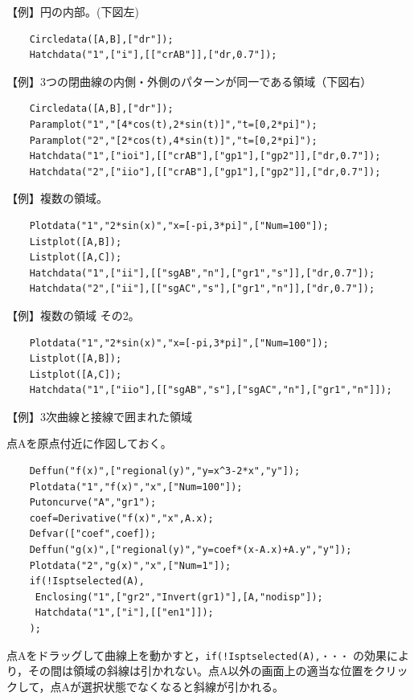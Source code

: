 \documentclass[papersize,a4paper,12pt,uplatex]{jsarticle}
\begin{document}
\begin{description}
\vspace{\baselineskip}
【例】円の内部。(下図左)
\begin{verbatim}
    Circledata([A,B],["dr"]);
    Hatchdata("1",["i"],[["crAB"]],["dr,0.7"]);
\end{verbatim}

【例】3つの閉曲線の内側・外側のパターンが同一である領域（下図右）
\begin{verbatim}
    Circledata([A,B],["dr"]);
    Paramplot("1","[4*cos(t),2*sin(t)]","t=[0,2*pi]");
    Paramplot("2","[2*cos(t),4*sin(t)]","t=[0,2*pi]");
    Hatchdata("1",["ioi"],[["crAB"],["gp1"],["gp2"]],["dr,0.7"]);
    Hatchdata("2",["iio"],[["crAB"],["gp1"],["gp2"]],["dr,0.7"]);
\end{verbatim}
\vspace{\baselineskip}
\hspace{5mm}  \hspace{5mm}    

【例】複数の領域。
\begin{verbatim}
    Plotdata("1","2*sin(x)","x=[-pi,3*pi]",["Num=100"]);
    Listplot([A,B]);
    Listplot([A,C]);
    Hatchdata("1",["ii"],[["sgAB","n"],["gr1","s"]],["dr,0.7"]);
    Hatchdata("2",["ii"],[["sgAC","s"],["gr1","n"]],["dr,0.7"]);
\end{verbatim}
\begin{center}
\begin{center}  \end{center}
\end{center}

【例】複数の領域  その2。
\begin{verbatim}
    Plotdata("1","2*sin(x)","x=[-pi,3*pi]",["Num=100"]);
    Listplot([A,B]);
    Listplot([A,C]);
    Hatchdata("1",["iio"],[["sgAB","s"],["sgAC","n"],["gr1","n"]]);
\end{verbatim}
\begin{center}
\begin{center}  \end{center}
\end{center}


【例】3次曲線と接線で囲まれた領域

    点Aを原点付近に作図しておく。
\begin{verbatim}
    Deffun("f(x)",["regional(y)","y=x^3-2*x","y"]);
    Plotdata("1","f(x)","x",["Num=100"]);
    Putoncurve("A","gr1");
    coef=Derivative("f(x)","x",A.x);
    Defvar(["coef",coef]);
    Deffun("g(x)",["regional(y)","y=coef*(x-A.x)+A.y","y"]);
    Plotdata("2","g(x)","x",["Num=1"]);
    if(!Isptselected(A),
     Enclosing("1",["gr2","Invert(gr1)"],[A,"nodisp"]);
     Hatchdata("1",["i"],[["en1"]]);
    );
\end{verbatim}
点Aをドラッグして曲線上を動かすと，\verb|if(!Isptselected(A),・・・| の効果により，その間は領域の斜線は引かれない。点A以外の画面上の適当な位置をクリックして，点Aが選択状態でなくなると斜線が引かれる。


\end{description}
\end{document}
